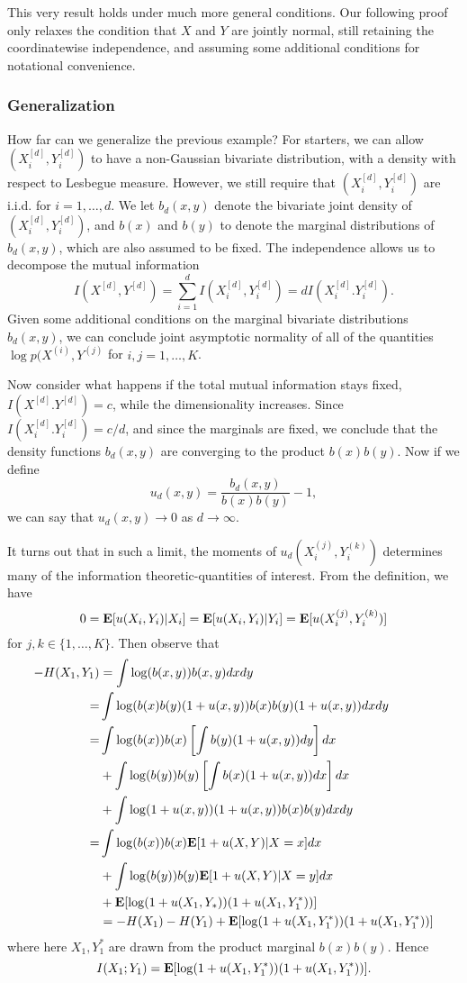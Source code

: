 \documentclass[12pt]{article}
\begin{document}
This very result holds under much more general conditions.  Our
following proof only relaxes the condition that $X$ and $Y$ are
jointly normal, still retaining the coordinatewise independence, and
assuming some additional conditions for notational convenience.

\subsubsection{Generalization}

How far can we generalize the previous example?  For starters, we can
allow $(X_i^{[d]}, Y_i^{[d]})$ to have a non-Gaussian bivariate
distribution, with a density with respect to Lesbegue measure.
However, we still require that $(X_i^{[d]}, Y_i^{[d]})$ are i.i.d. for
$i = 1,\hdots, d$.  We let $b_d(x, y)$ denote the bivariate joint
density of $(X_i^{[d]}, Y_i^{[d]})$, and $b(x)$ and $b(y)$ to denote
the marginal distributions of $b_d(x, y)$, which are also assumed to
be fixed.  The independence allows us to decompose the mutual
information
\[
I(X^{[d]}, Y^{[d]}) = \sum_{i=1}^d I(X_i^{[d]}, Y_i^{[d]}) = d I(X_i^{[d]}. Y_i^{[d]}).
\]
Given some additional conditions on the marginal bivariate
distributions $b_d(x, y)$, we can conclude joint asymptotic normality
of all of the quantities $\log p(X^{(i)}, Y^{(j)}$ for $i, j =
1,\hdots, K$.

Now consider what happens if the total mutual information stays fixed,
$I(X^{[d]}. Y^{[d]}) = c$, while the dimensionality increases.  Since
$I(X_i^{[d]}. Y_i^{[d]}) = c/d$, and since the marginals are fixed,
we conclude that the density functions $b_d(x, y)$ are converging
to the product $b(x) b(y)$.  Now if we define
\[
u_d(x, y) = \frac{b_d(x, y)}{b(x) b(y)} - 1,
\]
we can say that $u_d(x, y) \to 0$ as $d \to \infty$.

It turns out that in such a limit, the moments of $u_d(X_i^{(j)},
Y_i^{(k)})$ determines many of the information theoretic-quantities of
interest.  From the definition, we have 
\[
0 = \textbf{E}[u(X_i, Y_i)|X_i] = \textbf{E}[u(X_i, Y_i)|Y_i] = \textbf{E}[u(X_i^{(j)}, Y_i^{(k)})]
\]
for $j, k \in \{1,\hdots, K\}$.
Then observe that
\begin{align*}
-H(X_1, Y_1) &= \int \log(b(x, y)) b(x,y) dx dy
\\=& \int \log (b(x)b(y)(1 + u(x, y)) b(x) b(y) (1 + u(x, y)) dx dy
\\=& \int \log(b(x)) b(x) \left[\int b(y) (1 + u(x, y)) dy\right]dx 
\\&+ \int \log(b(y)) b(y) \left[\int b(x) (1 + u(x, y)) dx\right]dx 
\\&+ \int \log(1 + u(x, y)) (1 + u(x, y)) b(x) b(y) dx dy
\\=& \int \log(b(x)) b(x) \textbf{E}[1 + u(X, Y)|X = x] dx 
\\&+ \int \log(b(y)) b(y) \textbf{E}[1 + u(X, Y)|X = y] dx 
\\&+ \textbf{E}[\log(1 + u(X_1, Y_*))(1 + u(X_1, Y_1^*))]
\\&= -H(X_1) - H(Y_1) + \textbf{E}[\log(1 + u(X_1, Y_1^*))(1 + u(X_1, Y_1^*))]
\end{align*}
where here $X_1, Y_1^*$ are drawn from the product marginal $b(x)b(y)$.
Hence
\[
I(X_1; Y_1) = \textbf{E}[\log(1 + u(X_1, Y_1^*))(1 + u(X_1, Y_1^*))].
\]
\end{document}
